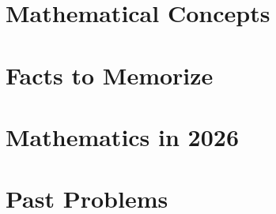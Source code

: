 \documentclass[11pt,oneside]{book}
\theoremstyle{sciencequizdefinition}
\theoremstyle{sciencequizplain}
\theoremstyle{sciencequizdefinition}
\theoremstyle{sciencequizsameline}
\begin{document}
    

    \part{Mathematical Concepts}

    

    \part{Facts to Memorize}

    

    \part{Mathematics in 2026}

    

    \part{Past Problems}

    
\end{document}
